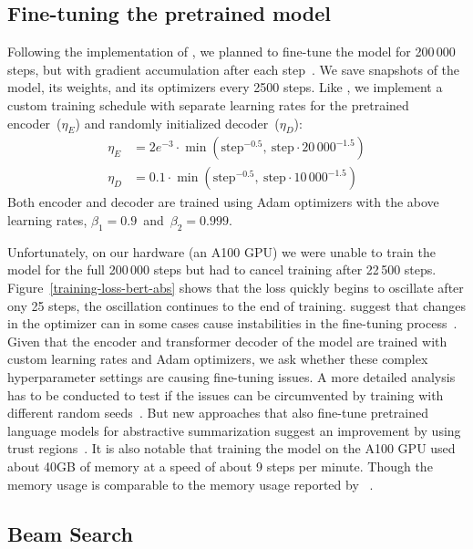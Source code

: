 \subsection{Fine-tuning the pretrained model}

Following the implementation of \cite{LiuL2019}, we planned to fine-tune the \BertSumAbs model for 200\,000 steps, but with gradient accumulation after each step~\cite{LiuL2019}. We save snapshots of the model, its weights, and its optimizers every 2500 steps.
Like \citeauthor{LiuL2019}, we implement a custom training schedule with separate learning rates for the pretrained encoder~(\(\eta_E\)) and randomly initialized decoder~(\(\eta_D\)):
\begin{align}
    \eta_E &= 2e^{-3} \cdot \min( \text{step}^{-0.5},\ \text{step} \cdot 20\,000^{-1.5} ) \\
    \eta_D &= 0.1 \cdot \min( \text{step}^{-0.5},\ \text{step} \cdot 10\,000^{-1.5} )
\end{align}
Both encoder and decoder are trained using Adam optimizers with the above learning rates, \(\beta_1 = 0.9\)~and~\(\beta_2 = 0.999\).

Unfortunately, on our hardware (an A100 GPU) we were unable to train the model for the full 200\,000 steps but had to cancel training after 22\,500 steps.
Figure~\ref{training-loss-bert-abs} shows that the loss quickly begins to oscillate after ony 25 steps, the oscillation continues to the end of training.
\citeauthor{ZhangWKWA2020} suggest that changes in the optimizer can in some cases cause instabilities in the fine-tuning process~\cite{ZhangWKWA2020}.
Given that the \Bert encoder and transformer decoder of the \BertSumAbs model are trained with custom learning rates and Adam optimizers, we ask whether these complex hyperparameter settings are causing fine-tuning issues.
A more detailed analysis has to be conducted to test if the issues can be circumvented by training with different random seeds~\cite{DodgeISFHS2020}.
But new approaches that also fine-tune pretrained language models for abstractive summarization suggest an improvement by using trust regions~\cite{AghajanyanSGGZG2020}.
It is also notable that training the \BertSumAbs model on the A100 GPU used about 40GB of memory at a speed of about 9 steps per minute.
Though the memory usage is comparable to the memory usage reported by \citeauthor{LiuL2019}~\cite{LiuL2019}.

\subsection{Beam Search}

